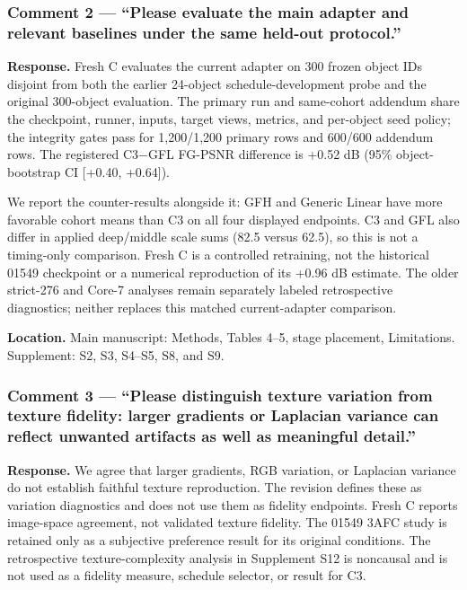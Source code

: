 \documentclass[
  10pt,
]{article}
\begin{document}
\hypertarget{comment-2-please-evaluate-the-main-adapter-and-relevant-baselines-under-the-same-held-out-protocol.}{%
\subsubsection{Comment 2 --- ``Please evaluate the main adapter and
relevant baselines under the same held-out
protocol.''}\label{comment-2-please-evaluate-the-main-adapter-and-relevant-baselines-under-the-same-held-out-protocol.}}

\textbf{Response.} Fresh C evaluates the current adapter on 300 frozen
object IDs disjoint from both the earlier 24-object schedule-development
probe and the original 300-object evaluation. The primary run and
same-cohort addendum share the checkpoint, runner, inputs, target views,
metrics, and per-object seed policy; the integrity gates pass for
1,200/1,200 primary rows and 600/600 addendum rows. The registered
C3−GFL FG-PSNR difference is +0.52 dB (95\% object-bootstrap CI
{[}+0.40, +0.64{]}).

We report the counter-results alongside it: GFH and Generic Linear have
more favorable cohort means than C3 on all four displayed endpoints. C3
and GFL also differ in applied deep/middle scale sums (82.5 versus
62.5), so this is not a timing-only comparison. Fresh C is a controlled
retraining, not the historical 01549 checkpoint or a numerical
reproduction of its +0.96 dB estimate. The older strict-276 and Core-7
analyses remain separately labeled retrospective diagnostics; neither
replaces this matched current-adapter comparison.

\textbf{Location.} Main manuscript: Methods, Tables 4--5, stage
placement, Limitations. Supplement: S2, S3, S4--S5, S8, and S9.

\hypertarget{comment-3-please-distinguish-texture-variation-from-texture-fidelity-larger-gradients-or-laplacian-variance-can-reflect-unwanted-artifacts-as-well-as-meaningful-detail.}{%
\subsubsection{Comment 3 --- ``Please distinguish texture variation from
texture fidelity: larger gradients or Laplacian variance can reflect
unwanted artifacts as well as meaningful
detail.''}\label{comment-3-please-distinguish-texture-variation-from-texture-fidelity-larger-gradients-or-laplacian-variance-can-reflect-unwanted-artifacts-as-well-as-meaningful-detail.}}

\textbf{Response.} We agree that larger gradients, RGB variation, or
Laplacian variance do not establish faithful texture reproduction. The
revision defines these as variation diagnostics and does not use them as
fidelity endpoints. Fresh C reports image-space agreement, not validated
texture fidelity. The 01549 3AFC study is retained only as a subjective
preference result for its original conditions. The retrospective
texture-complexity analysis in Supplement S12 is noncausal and is not
used as a fidelity measure, schedule selector, or result for C3.
\end{document}
